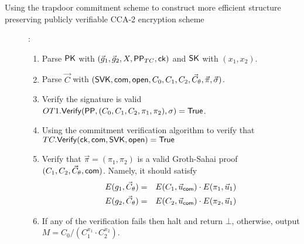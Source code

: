 \begin{section}{Using the trapdoor commitment scheme to construct more efficient structure preserving publicly verifiable CCA-2 encryption scheme}
\begin{description}
    \item[]:
      \begin{enumerate}
      \item Parse $\mathsf{PK}$ with $(\vec{g}_1, \vec{g}_2, X, \mathsf{PP}_{TC}, \mathsf{ck})$ and $\mathsf{SK}$ with $(x_1, x_2)$.
      \item Parse $\vec{C}$ with $ (\mathsf{SVK}, \mathsf{com}, \mathsf{open}, C_0, C_1, C_2, \vec{C}_{\theta}, \vec{\pi}, \vec{\sigma})$.
      \item Verify the signature is valid $OT1.{\mathsf{Verify}}(\mathsf{PP},  (C_0, C_1, C_2, \pi_1,\pi_2), \sigma) = \mathsf{True}$.
      \item Using the commitment verification algorithm to verify that $TC.{\mathsf{Verify}}(\mathsf{ck}, \mathsf{com}, \mathsf{SVK}, \mathsf{open}) = \mathsf{True}$
      \item Verify that $\vec{\pi}=(\pi_1,\pi_2)$ is a valid Groth-Sahai proof \wrt  $(C_1, C_2, \vec{C}_{\theta}, \mathsf{com})$. Namely, 
			it should satisfy 
			\begin{eqnarray} \label{ver-eq} 
			E(g_1,\vec{C}_{\theta}) &=& E(C_1 , \vec{u}_{\mathsf{com}}) \cdot E(\pi_1,\vec{u}_1) \\ \nonumber
			E(g_2,\vec{C}_{\theta}) &=& E(C_2 , \vec{u}_{\mathsf{com}}) \cdot E(\pi_2,\vec{u}_1)
			\end{eqnarray}
      \item If any of the verification fails then halt and return $\bot$, otherwise, output $M=C_0/(C_1^{x_1}\cdot C_2^{x_2})$.
      \end{enumerate}
      
    \end{description}
\end{section}


